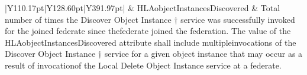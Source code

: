 \begin{landscape}
\begin{momtabletypeset}[8.00]
{{\begin{tabular}{|Y{110.17pt}|Y{128.60pt}|Y{391.97pt}|}
                    & HLAobjectInstancesDiscovered                 & Total number of times the Discover Object Instance † service was successfully invoked for the joined federate since the\allowbreak{}federate joined the federation.\allowbreak{} The value of the HLAobjectInstancesDiscovered attribute shall include multiple\allowbreak{}invocations of the Discover Object Instance † service for a given object instance that may occur as a result of invocation\allowbreak{}of the Local Delete Object Instance service at a federate.\allowbreak{} \\
                    \hline
                \end{tabular}%
            }%
        }%
    \end{momtabletypeset}
    \newpage


\end{landscape}
